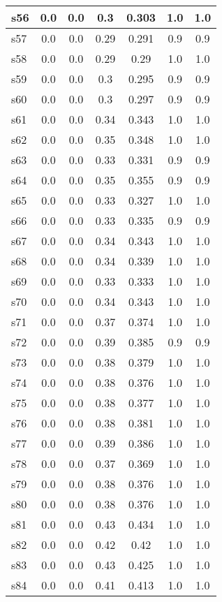 \documentclass{article}
\begin{document}
\begin{tabular}{|l|c|c|c|c|c|c|}
\hline
s56 &0.0 & 0.0 & 0.3 & 0.303 & 1.0 & 1.0\\
\hline
s57 &0.0 & 0.0 & 0.29 & 0.291 & 0.9 & 0.9\\
\hline
s58 &0.0 & 0.0 & 0.29 & 0.29 & 1.0 & 1.0\\
\hline
s59 &0.0 & 0.0 & 0.3 & 0.295 & 0.9 & 0.9\\
\hline
s60 &0.0 & 0.0 & 0.3 & 0.297 & 0.9 & 0.9\\
\hline
s61 &0.0 & 0.0 & 0.34 & 0.343 & 1.0 & 1.0\\
\hline
s62 &0.0 & 0.0 & 0.35 & 0.348 & 1.0 & 1.0\\
\hline
s63 &0.0 & 0.0 & 0.33 & 0.331 & 0.9 & 0.9\\
\hline
s64 &0.0 & 0.0 & 0.35 & 0.355 & 0.9 & 0.9\\
\hline
s65 &0.0 & 0.0 & 0.33 & 0.327 & 1.0 & 1.0\\
\hline
s66 &0.0 & 0.0 & 0.33 & 0.335 & 0.9 & 0.9\\
\hline
s67 &0.0 & 0.0 & 0.34 & 0.343 & 1.0 & 1.0\\
\hline
s68 &0.0 & 0.0 & 0.34 & 0.339 & 1.0 & 1.0\\
\hline
s69 &0.0 & 0.0 & 0.33 & 0.333 & 1.0 & 1.0\\
\hline
s70 &0.0 & 0.0 & 0.34 & 0.343 & 1.0 & 1.0\\
\hline
s71 &0.0 & 0.0 & 0.37 & 0.374 & 1.0 & 1.0\\
\hline
s72 &0.0 & 0.0 & 0.39 & 0.385 & 0.9 & 0.9\\
\hline
s73 &0.0 & 0.0 & 0.38 & 0.379 & 1.0 & 1.0\\
\hline
s74 &0.0 & 0.0 & 0.38 & 0.376 & 1.0 & 1.0\\
\hline
s75 &0.0 & 0.0 & 0.38 & 0.377 & 1.0 & 1.0\\
\hline
s76 &0.0 & 0.0 & 0.38 & 0.381 & 1.0 & 1.0\\
\hline
s77 &0.0 & 0.0 & 0.39 & 0.386 & 1.0 & 1.0\\
\hline
s78 &0.0 & 0.0 & 0.37 & 0.369 & 1.0 & 1.0\\
\hline
s79 &0.0 & 0.0 & 0.38 & 0.376 & 1.0 & 1.0\\
\hline
s80 &0.0 & 0.0 & 0.38 & 0.376 & 1.0 & 1.0\\
\hline
s81 &0.0 & 0.0 & 0.43 & 0.434 & 1.0 & 1.0\\
\hline
s82 &0.0 & 0.0 & 0.42 & 0.42 & 1.0 & 1.0\\
\hline
s83 &0.0 & 0.0 & 0.43 & 0.425 & 1.0 & 1.0\\
\hline
s84 &0.0 & 0.0 & 0.41 & 0.413 & 1.0 & 1.0\\

\end{tabular}
\end{document}
